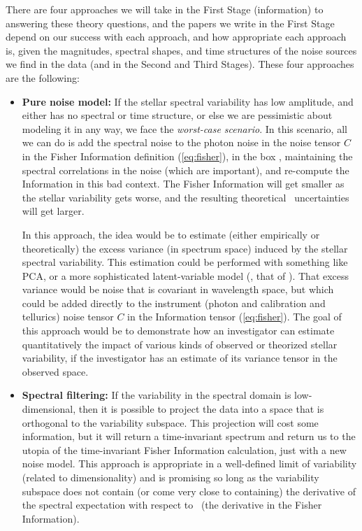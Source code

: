 \documentclass[12pt, letterpaper]{article}
\begin{document}
There are four approaches we will take in the First Stage (information)
to answering these theory questions,
and the papers we write in the First Stage depend on our success with each
approach, and how appropriate each approach is, given the magnitudes, spectral
shapes, and time structures of the noise sources we find in the data (and in
the Second and Third Stages). 
These four approaches are the following:
\begin{itemize}
\item
\textbf{Pure noise model:}
If the stellar spectral variability has low amplitude, and either has
no spectral or time structure, or else we are pessimistic about
modeling it in any way, we face the \emph{worst-case scenario}.
In this scenario, all we can do is add the spectral noise to the photon noise
in the noise tensor $C$ in the Fisher Information definition (\ref{eq:fisher}),
in the box ,
maintaining the spectral correlations in the noise (which are important),
and re-compute the Information in this bad context.
The Fisher Information will get smaller as the stellar variability
gets worse, and the resulting theoretical \EPRV\ uncertainties will
get larger.

In this approach, the idea would be to estimate (either empirically or
theoretically) the excess variance (in spectrum space) induced by the stellar
spectral variability.
This estimation could be performed with something like PCA, or a more
sophisticated latent-variable model (\eg, that of \citealt{HMF}).
That excess variance would be noise that is covariant in wavelength space,
but which could be added directly to the instrument (photon and calibration
and tellurics) noise tensor $C$ in the Information tensor (\ref{eq:fisher}).
The goal of this approach would be to demonstrate how an investigator
can estimate quantitatively the impact of various kinds of observed or
theorized stellar variability, if the investigator has an estimate of
its variance tensor in the observed space.
\item
\textbf{Spectral filtering:}
If the variability in the spectral domain is low-dimensional, then it is
possible to project the data into a space that is orthogonal to the
variability subspace.
This projection will cost some information, but it will return a time-invariant
spectrum and return us to the utopia of the time-invariant Fisher Information
calculation, just with a new noise model.
This approach is appropriate in a well-defined limit of variability (related
to dimensionality) and is
promising so long as the variability subspace does not contain (or come very
close to containing) the derivative of the spectral expectation with respect
to \RV\ (the derivative in the Fisher Information).


\end{itemize}
\end{document}
